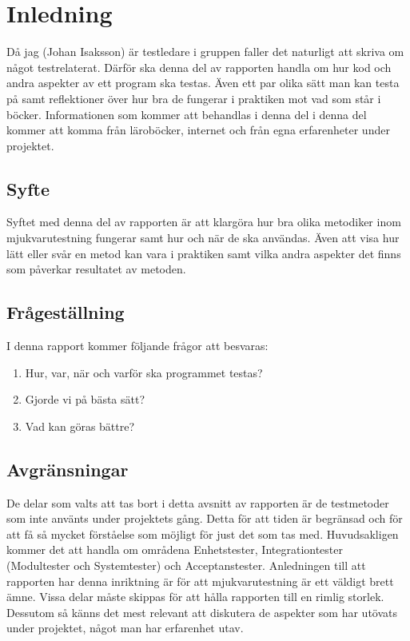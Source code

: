 \section{Inledning}
	Då jag (Johan Isaksson) är testledare i gruppen faller det naturligt att skriva om något testrelaterat. Därför ska denna del av rapporten handla om hur kod och andra aspekter av ett program ska testas. Även ett par olika sätt man kan testa på samt reflektioner över hur bra de fungerar i praktiken mot vad som står i böcker. Informationen som kommer att behandlas i denna del i denna del kommer att komma från läroböcker, internet och från egna erfarenheter under projektet. 
	
	
	\subsection{Syfte}
	Syftet med denna del av rapporten är att klargöra hur bra olika metodiker inom mjukvarutestning fungerar samt hur och när de ska användas. Även att visa hur lätt eller svår en metod kan vara i praktiken samt vilka andra aspekter det finns som påverkar resultatet av metoden.
	
	
	\subsection{Frågeställning}
	I denna rapport kommer följande frågor att besvaras:
	\begin{enumerate}
	\item{Hur, var, när och varför ska programmet testas?}
	\item{Gjorde vi på bästa sätt?}
	\item{Vad kan göras bättre?}
	\end{enumerate}
	
	\subsection{Avgränsningar}
	De delar som valts att tas bort i detta avsnitt av rapporten är de testmetoder som inte använts under projektets gång. Detta för att tiden är begränsad och för att få så mycket förståelse som möjligt för just det som tas med. Huvudsakligen kommer det att handla om områdena Enhetstester, Integrationtester (Modultester och Systemtester) och Acceptanstester. \newline
	Anledningen till att rapporten har denna inriktning är för att mjukvarutestning är ett väldigt brett ämne. Vissa delar måste skippas för att hålla rapporten till en rimlig storlek. Dessutom så känns det mest relevant att diskutera de aspekter som har utövats under projektet, något man har erfarenhet utav.